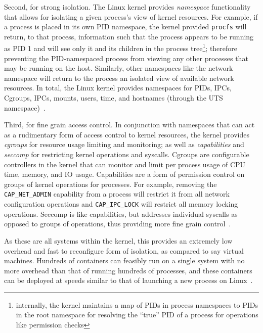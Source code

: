 \documentclass[12pt,titlepage]{article}
\begin{document}
Second, for strong isolation.
The Linux kernel provides \textit{namespace} functionality that allows for isolating a given process's view of kernel resources.
For example, if a process is placed in its own PID namespace, the kernel provided \texttt{procfs} will return, to that process, information such that the process appears to be running as PID 1 and will see only it and its children in the process tree\footnote{internally, the kernel maintains a map of PIDs in process namespaces to PIDs in the root namespace for resolving the ``true'' PID of a process for operations like permission checks};
therefore preventing the PID-namespaced process from viewing any other processes that may be running on the host.
Similarly, other namespaces like the network namespace will return to the process an isolated view of available network resources.
In total, the Linux kernel provides namespaces for PIDs, IPCs, Cgroups, IPCs, mounts, users, time, and hostnames (through the UTS namespace)~\cite{juliaevanscontainers,namespacesman}.

Third, for fine grain access control.
In conjunction with namespaces that can act as a rudimentary form of access control to kernel resources, the kernel provides \textit{cgroups} for resource usage limiting and monitoring; as well as \textit{capabilities} and \textit{seccomp} for restricting kernel operations and syscalls.
Cgroups are configurable controllers in the kernel that can monitor and limit per process usage of CPU time, memory, and IO usage.
Capabilities are a form of permission control on groups of kernel operations for processes.
For example, removing the \texttt{CAP\_NET\_ADMIN} capability from a process will restrict it from all network configuration operations and \texttt{CAP\_IPC\_LOCK} will restrict all memory locking operations.
Seccomp is like capabilities, but addresses individual syscalls as opposed to groups of operations, thus providing more fine grain control~\cite{juliaevanscontainers,cgroupsman}.

As these are all systems within the kernel, this provides an extremely low overhead and fast to reconfigure form of isolation, as compared to say virtual machines.
Hundreds of containers can feasibly run on a single system with no more overhead than that of running hundreds of processes, and these containers can be deployed at speeds similar to that of launching a new process on Linux~\cite{rad2017introduction}.
\end{document}
